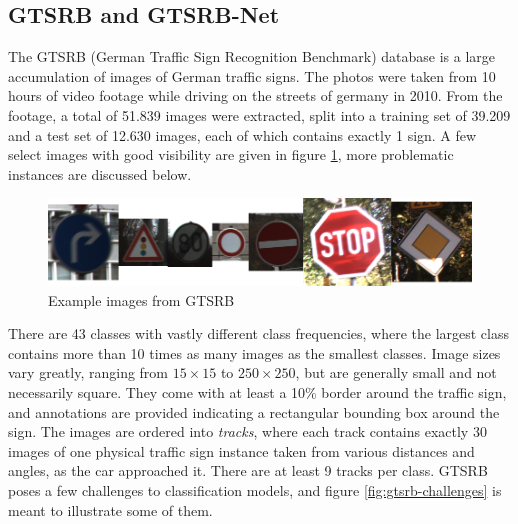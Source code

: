 \documentclass[11pt, a4paper]{article}
\begin{document}
\subsection{GTSRB and GTSRB-Net}
\label{sec:generation-large-sets:gtsrb}
The GTSRB (German Traffic Sign Recognition Benchmark) database is a large accumulation of images of German traffic signs. The photos were taken from 10 hours of video footage while driving on the streets of germany in 2010. From the footage, a total of 51.839 images were extracted, split into a training set of 39.209 and a test set of 12.630 images, each of which contains exactly 1 sign. A few select images with good visibility are given in figure \ref{fig:gtsrb-overview}, more problematic instances are discussed below.

\begin{figure}[htb]
	\centering
	\includegraphics[width=\textwidth]{images/gtsrb/overview.png}
	\caption{Example images from GTSRB}
	\label{fig:gtsrb-overview}
\end{figure}

There are 43 classes with vastly different class frequencies, where the largest class contains more than 10 times as many images as the smallest classes. Image sizes vary greatly, ranging from $15\times15$ to $250\times 250$, but are generally small and not necessarily square. They come with at least a 10\% border around the traffic sign, and annotations are provided indicating a rectangular bounding box around the sign. The images are ordered into \emph{tracks}, where each track contains exactly 30 images of one physical traffic sign instance taken from various distances and angles, as the car approached it. There are at least 9 tracks per class. GTSRB poses a few challenges to classification models, and figure \ref{fig:gtsrb-challenges} is meant to illustrate some of them.
\end{document}
